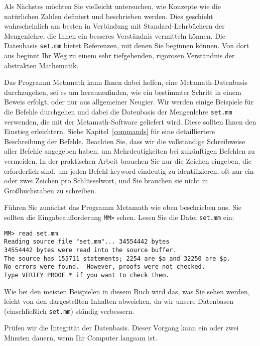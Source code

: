 Als Nächstes möchten Sie vielleicht untersuchen, wie Konzepte wie die natürlichen Zahlen definiert und beschrieben werden.  Dies geschieht wahrscheinlich am besten in Verbindung mit Standard-Lehrbüchern der Mengenlehre, die Ihnen ein besseres Verständnis vermitteln können.  Die Datenbasis \texttt{set.mm} bietet Referenzen, mit denen Sie beginnen können.  Von dort aus beginnt Ihr Weg zu einem sehr tiefgehenden, rigorosen Verständnis der abstrakten Mathematik.

Das Programm Metamath kann Ihnen dabei helfen, eine Metamath-Datenbasis durchzugehen, sei es um herauszufinden, wie ein bestimmter Schritt in einem Beweis erfolgt, oder nur aus allgemeiner Neugier.  Wir werden einige Beispiele für die Befehle durchgehen und dabei die Datenbasis der Mengenlehre \texttt{set.mm} verwenden, die mit der Metamath-Software geliefert wird.  Diese sollten Ihnen den Einstieg erleichtern.  Siehe Kapitel~\ref{commands} für eine detailliertere Beschreibung der Befehle.  Beachten Sie, dass wir die vollständige Schreibweise aller Befehle angegeben haben, um Mehrdeutigkeiten bei zukünftigen Befehlen zu vermeiden.  In der praktischen Arbeit brauchen Sie nur die Zeichen eingeben, die erforderlich sind, um jeden Befehl keyword eindeutig zu identifizieren, oft nur ein oder zwei Zeichen pro Schlüsselwort, und Sie brauchen sie nicht in Großbuchstaben zu schreiben.

Führen Sie zunächst das Programm Metamath wie oben beschrieben aus.  Sie sollten die Eingabeaufforderung \verb/MM>/ sehen.  Lesen Sie die Datei \texttt{set.mm} ein:

\begin{verbatim}
MM> read set.mm
Reading source file "set.mm"... 34554442 bytes
34554442 bytes were read into the source buffer.
The source has 155711 statements; 2254 are $a and 32250 are $p.
No errors were found.  However, proofs were not checked.
Type VERIFY PROOF * if you want to check them.
\end{verbatim}

Wie bei den meisten Beispielen in diesem Buch wird das, was Sie sehen werden, leicht von den dargestellten Inhalten abweichen, da wir unsere Datenbasen (einschließlich \texttt{set.mm}) ständig verbessern.

Prüfen wir die Integrität der Datenbasis.  Dieser Vorgang kann ein oder zwei Minuten dauern, wenn Ihr Computer langsam ist.

